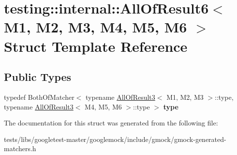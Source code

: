 \hypertarget{structtesting_1_1internal_1_1AllOfResult6}{}\section{testing\+:\+:internal\+:\+:All\+Of\+Result6$<$ M1, M2, M3, M4, M5, M6 $>$ Struct Template Reference}
\label{structtesting_1_1internal_1_1AllOfResult6}
\subsection*{Public Types}
\begin{DoxyCompactItemize}
\item 
\mbox{\label{structtesting_1_1internal_1_1AllOfResult6_a5385655911ce2c1d3fccd802c1754139}} 
typedef Both\+Of\+Matcher$<$ typename \hyperlink{structtesting_1_1internal_1_1AllOfResult3}{All\+Of\+Result3}$<$ M1, M2, M3 $>$\+::type, typename \hyperlink{structtesting_1_1internal_1_1AllOfResult3}{All\+Of\+Result3}$<$ M4, M5, M6 $>$\+::type $>$ {\bfseries type}
\end{DoxyCompactItemize}


The documentation for this struct was generated from the following file\+:\begin{DoxyCompactItemize}
\item 
tests/libs/googletest-\/master/googlemock/include/gmock/gmock-\/generated-\/matchers.\+h\end{DoxyCompactItemize}

